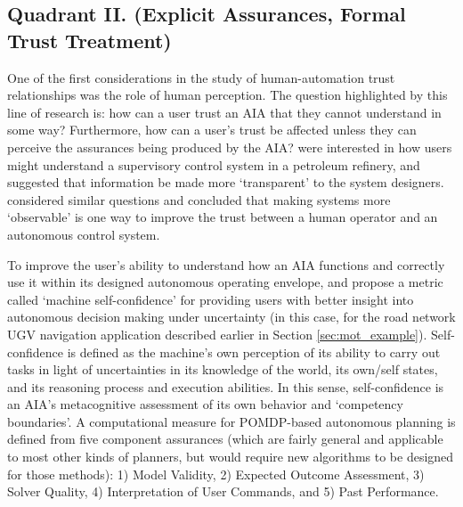 \subsection{Quadrant II. (Explicit Assurances, Formal Trust Treatment)}\label{sec:q2}
One of the first considerations in the study of human-automation trust relationships was the role of human perception. 
The question highlighted by this line of research is: how can a user trust an AIA that they cannot understand in some way? Furthermore, how can a user's trust be affected unless they can perceive the assurances being produced by the AIA?
\citet{Sheridan1984-kx} were interested in how users might understand a supervisory control system in a petroleum refinery, and suggested that information be made more `transparent' to the system designers. \citet{Muir1987-mk,Muir1994-ow} considered similar questions and concluded that making systems more `observable' is one way to improve the trust between a human operator and an autonomous control system. 

To improve the user's ability to understand how an AIA functions and correctly use it within its designed autonomous operating envelope, \citet{Aitken2016-fb} and \citet{Aitken2016-cv} propose a metric called `machine self-confidence' for providing users with better insight into autonomous decision making under uncertainty (in this case, for the road network UGV navigation application described earlier in Section \ref{sec:mot_example}). 
Self-confidence is defined as the machine's own perception of its ability to carry out tasks in light of uncertainties in its knowledge of the world, its own/self states, and its reasoning process and execution abilities. 
In this sense, self-confidence is an AIA's metacognitive assessment of its own behavior and `competency boundaries'. 
A computational measure for POMDP-based autonomous planning is defined from five component assurances (which are fairly general and applicable to most other kinds of planners, but would require new algorithms to be designed for those methods): 1) Model Validity, 2) Expected Outcome Assessment, 3) Solver Quality, 4) Interpretation of User Commands, and 5) Past Performance. 

